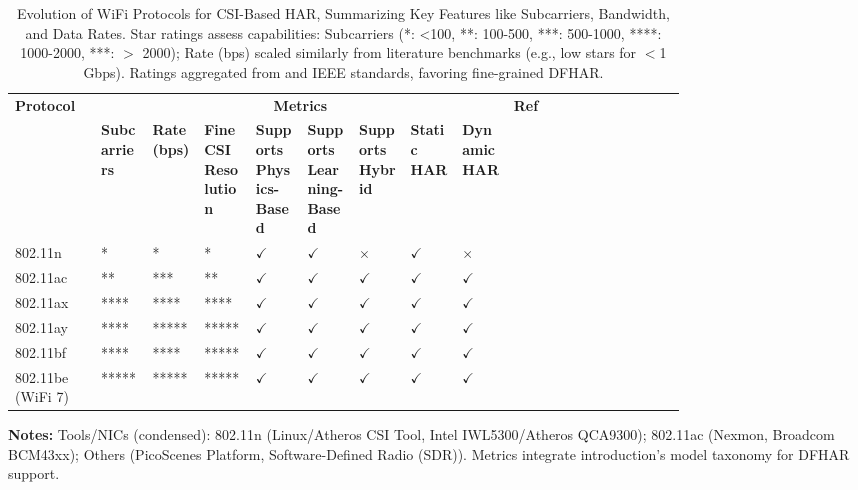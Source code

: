 \documentclass[Afour,sageh,times]{sagej}
\begin{document}
\begin{table}[htbp]
\centering
\footnotesize
\caption{Evolution of WiFi Protocols for CSI-Based HAR, Summarizing Key Features like Subcarriers, Bandwidth, and Data Rates. Star ratings assess capabilities: Subcarriers (*: <100, **: 100-500, ***: 500-1000, ****: 1000-2000, ***: $>$ 2000); Rate (bps) scaled similarly from literature benchmarks (e.g., low stars for $<$1 Gbps). Ratings aggregated from \citep{venkatnarayan2018multiperson} and IEEE standards, favoring fine-grained DFHAR.}
\label{tab: protocols}
\begin{tabularx}{\linewidth}{@{} m{0.1\linewidth} *{8}{m{0.06\linewidth}} m{0.2\linewidth} @{}}
\toprule
\textbf{Protocol} & \multicolumn{8}{c}{\textbf{Metrics}} & \textbf{Ref} \\
\cline{2-9}
 & \textbf{Subcarriers} & \textbf{Rate (bps)} & \textbf{Fine CSI Resolution} & \textbf{Supports Physics-Based} & \textbf{Supports Learning-Based} & \textbf{Supports Hybrid} & \textbf{Static HAR} & \textbf{Dynamic HAR} &  \\
\midrule
\rowcolor{lightgray} 802.11n & * & * & * & $\checkmark$ & $\checkmark$ & $\times$ & $\checkmark$ & $\times$ & \citep{guo2019robust, ding2020wihi}  \\
802.11ac & ** & *** & ** & $\checkmark$ & $\checkmark$ & $\checkmark$ & $\checkmark$ & $\checkmark$ & \citep{gringoli2019free, jiang2021eliminating}  \\
\rowcolor{lightgray} 802.11ax & **** & **** & **** & $\checkmark$ & $\checkmark$ & $\checkmark$ & $\checkmark$ & $\checkmark$ & \citep{yang2022autofi, zhou2022target}  \\
802.11ay & **** & ***** & ***** & $\checkmark$ & $\checkmark$ & $\checkmark$ & $\checkmark$ & $\checkmark$ & \citep{pegoraro2023rapid}  \\
\rowcolor{lightgray} 802.11bf & **** & **** & ***** & $\checkmark$ & $\checkmark$ & $\checkmark$ & $\checkmark$ & $\checkmark$ & \citep{Ting:2024_ieee, shalaby2022utilizing}  \\
802.11be (WiFi 7) & ***** & ***** & ***** & $\checkmark$ & $\checkmark$ & $\checkmark$ & $\checkmark$ & $\checkmark$ & \citep{du2024overview, pegoraro2023rapid}  \\
\bottomrule
\end{tabularx}
\smallskip
\textbf{Notes:} Tools/NICs (condensed): 802.11n (Linux/Atheros CSI Tool, Intel IWL5300/Atheros QCA9300); 802.11ac (Nexmon, Broadcom BCM43xx); Others (PicoScenes Platform, Software-Defined Radio (SDR)). Metrics integrate introduction's model taxonomy for DFHAR support.
\end{table}
\end{document}
